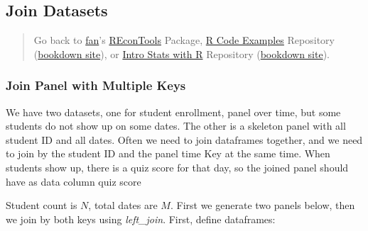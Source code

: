 \documentclass[
]{book}
\begin{document}
\hypertarget{join-datasets}{%
\subsection{Join Datasets}\label{join-datasets}}

\begin{quote}
Go back to \href{http://fanwangecon.github.io/}{fan}'s \href{https://fanwangecon.github.io/REconTools/}{REconTools} Package, \href{https://fanwangecon.github.io/R4Econ/}{R Code Examples} Repository (\href{https://fanwangecon.github.io/R4Econ/bookdown}{bookdown site}), or \href{https://fanwangecon.github.io/Stat4Econ/}{Intro Stats with R} Repository (\href{https://fanwangecon.github.io/Stat4Econ/bookdown}{bookdown site}).
\end{quote}

\hypertarget{join-panel-with-multiple-keys}{%
\subsubsection{Join Panel with Multiple Keys}\label{join-panel-with-multiple-keys}}

We have two datasets, one for student enrollment, panel over time, but some students do not show up on some dates. The other is a skeleton panel with all student ID and all dates. Often we need to join dataframes together, and we need to join by the student ID and the panel time Key at the same time. When students show up, there is a quiz score for that day, so the joined panel should have as data column quiz score

Student count is \(N\), total dates are \(M\). First we generate two panels below, then we join by both keys using \emph{left\_join}. First, define dataframes:
\end{document}

